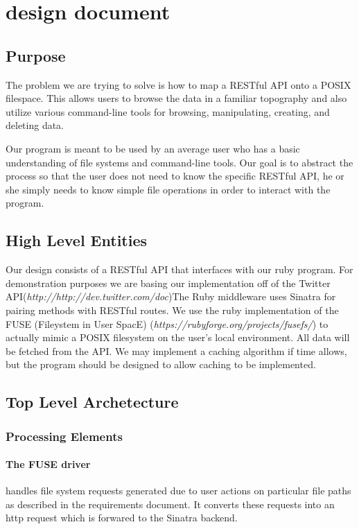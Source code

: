 \section{design document}
\subsection{Purpose}
The problem we are trying to solve is how to map a RESTful API onto a POSIX filespace. This allows users to browse the data in a familiar topography and also utilize various command-line tools for browsing, manipulating, creating, and deleting data. 

Our program is meant to be used by an average user who has a basic understanding of file systems and command-line tools. Our goal is to abstract the process so that the user does not need to know the specific RESTful API, he or she simply needs to know simple file operations in order to interact with the program.

\subsection{High Level Entities}
Our design consists of a RESTful API that interfaces with our ruby program. For demonstration purposes we are basing our implementation off of the Twitter API(\textit{http://http://dev.twitter.com/doc})The Ruby middleware uses Sinatra for pairing methods with RESTful routes. We use the ruby implementation of the FUSE (Fileystem in User SpacE) (\textit{https://rubyforge.org/projects/fusefs/}) to actually mimic a POSIX filesystem on the user's local environment. All data will be fetched from the API. We may implement a caching algorithm if time allows, but the program should be designed to allow caching to be implemented.   

\subsection{Top Level Archetecture}

\subsubsection{Processing Elements}

\paragraph{The FUSE driver} handles file system requests generated due
to user actions on particular file paths as described in the requirements
document. It converts these requests into an http request which is forwared to
the Sinatra backend.

